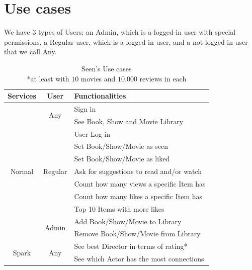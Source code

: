 \documentclass[oneside]{article}
\newcommand*\fpar{\hspace{1ex}}
\begin{document}
\section{Use cases}
\label{sec:cases}
\fpar We have 3 types of Users: an Admin, which is a logged-in user with special permissions, a Regular user, which is a logged-in user, and a not logged-in user that we call Any.
\begin{table}[H]
  \centering
  \begin{tabular}{c|c|l} 
    Services & User & Functionalities \\ \hline
    \multirow{11}{*}{ Normal }
      & \multirow{2}{*}{ Any } 
        & Sign in \\
      & & See Book, Show and Movie Library \\ \cline{2-3}
      & \multirow{7}{*}{ Regular } 
        & User Log in \\
      & & Set Book/Show/Movie as seen \\
      & & Set Book/Show/Movie as liked \\ 
      & & Ask for suggestions to read and/or watch \\ 
      & & Count how many views a specific Item has \\
      & & Count how many likes a specific Item has \\
      & & Top 10 Items with more likes \\ \cline{2-3}
    & \multirow{2}{*}{ Admin } 
        & Add Book/Show/Movie to Library \\
      & & Remove Book/Show/Movie from Library \\ \hline
    \multirow{2}{*}{ Spark }
      & \multirow{2}{*}{ Any }
        & See best Director in terms of rating* \\
      & & See which Actor has the most connections \\
  \end{tabular}
  \caption{Seen's Use cases\\
          \**at least with $10$ movies and $10.000$ reviews in each}
\end{table}
\end{document}
